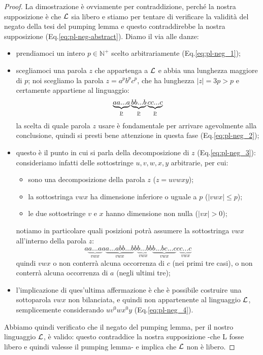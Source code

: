 \documentclass[class=book, crop=false, oneside, 12pt]{standalone}
\begin{document}
  \begin{proof}
    La dimostrazione è ovviamente per contraddizione, perché la nostra supposizione è che \(\mathcal{L}\) sia libero e stiamo per tentare di verificare la validità del negato della tesi del pumping lemma e questo contraddirebbe la nostra supposizione (Eq.\ref{eq:pl-neg-abstract}). Diamo il via alle danze:
    \begin{itemize}
      \item prendiamoci un intero \(p \in \mathbb{N}^+\) scelto arbitrariamente (Eq.\ref{eq:pl-neg_1});
      \item scegliamoci una parola \(z\) che appartenga a \(\mathcal{L}\) e abbia una lunghezza maggiore di \(p\); noi scegliamo la parola \(z = a^pb^pc^p\), che ha lunghezza \(|z| = 3p > p\) e certamente appartiene al linguaggio:
      \begin{equation*}
        \underbrace{aa...a}_\text{\emph{p}}\underbrace{bb...b}_\text{\emph{p}}\underbrace{cc...c}_\text{\emph{p}}
      \end{equation*}
      la scelta di quale parola \(z\) usare è fondamentale per arrivare agevolmente alla conclusione, quindi si presti bene attenzione in questa fase (Eq.\ref{eq:pl-neg_2});
      \item questo è il punto in cui si parla della decomposizione di \(z\) (Eq.\ref{eq:pl-neg_3}): consideriamo infatti delle sottostringe \(u, v, w, x, y\) arbitrarie, per cui:
      \begin{itemize}
        \item sono una decomposizione della parola \(z\) (\(z = uvwxy\));
        \item la sottostringa \(vwx\) ha dimensione inferiore o uguale a \(p\) (\(|vwx| \le p\));
        \item le due sottostringe \(v\) e \(x\) hanno dimensione non nulla (\(|vx| > 0\));
      \end{itemize}
      notiamo in particolare quali posizioni potrà assumere la sottostringa \(vwx\) all'interno della parola \(z\):
      \begin{equation*}
        a\underbrace{a...a}_{vwx}
        a\underbrace{a...abb...b}_{vwx}
        b\underbrace{b...b}_{vwx}
        b\underbrace{b...bc...c}_{vwx}
        c\underbrace{c...c}_{vwx}
      \end{equation*}
      quindi \(vwx\) o non conterrà alcuna occorrenza di \(c\) (nei primi tre casi), o non conterrà alcuna occorrenza di \(a\) (negli ultimi tre);
      \item l'implicazione di ques'ultima affermazione è che è possibile costruire una sottoparola \(vwx\) non bilanciata, e quindi non appartenente al linguaggio \(\mathcal{L}\), semplicemente considerando \(uv^0wx^0y\) (Eq.\ref{eq:pl-neg_4}).
    \end{itemize}
    Abbiamo quindi verificato che il negato del pumping lemma, per il nostro linguaggio \(\mathcal{L}\), è valido: questo contraddice la nostra supposizione -che L fosse libero e quindi valesse il pumping lemma- e implica che \(\mathcal{L}\) non è libero.
  \end{proof}
\end{document}

